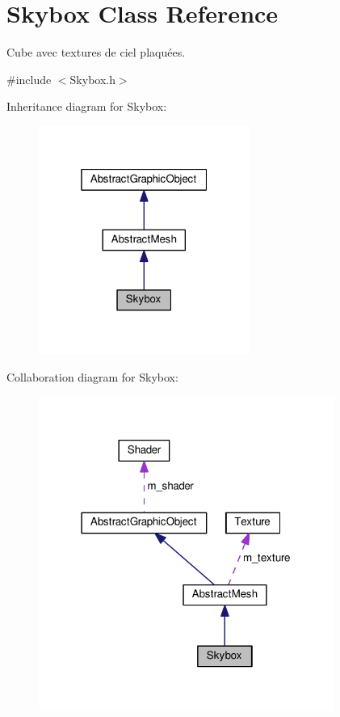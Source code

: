 \hypertarget{classSkybox}{\section{Skybox Class Reference}
\label{classSkybox}
}


Cube avec textures de ciel plaquées.  




{\ttfamily \#include $<$Skybox.\+h$>$}



Inheritance diagram for Skybox\+:\nopagebreak
\begin{figure}[H]
\begin{center}
\leavevmode
\includegraphics[width=196pt]{classSkybox__inherit__graph}
\end{center}
\end{figure}


Collaboration diagram for Skybox\+:\nopagebreak
\begin{figure}[H]
\begin{center}
\leavevmode
\includegraphics[width=274pt]{classSkybox__coll__graph}
\end{center}
\end{figure}
